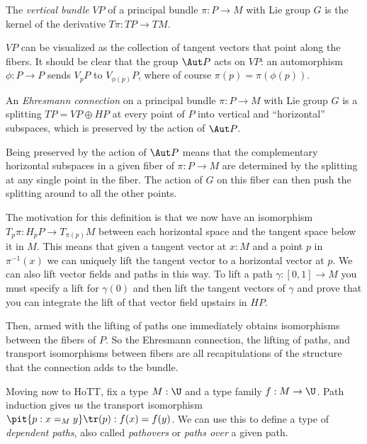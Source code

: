 \begin{mydef}
The \emph{vertical bundle} \( VP \) of a principal bundle \( \pi:P\to M \) with Lie group \( G \) is the kernel of the derivative \( T\pi:TP\to TM \). 
\end{mydef}

\(VP\) can be visualized as the collection of tangent vectors that point
along the fibers. It should be clear that the group \(\Aut P\) acts on
\(VP\): an automorphism \(\phi:P\to P\) sends \(V_pP\) to
\(V_{\phi(p)}P\), where of course \(\pi(p)=\pi(\phi(p))\).

\begin{mydef}
An \emph{Ehresmann connection} on a principal bundle \( \pi:P\to M \) with Lie group \( G \) is a splitting \( TP=VP\oplus HP \) at every point of \( P \) into vertical and ``horizontal'' subspaces, which is preserved by the action of \( \Aut P \).
\end{mydef}

Being preserved by the action of \(\Aut P\) means that the complementary
horizontal subspaces in a given fiber of \(\pi:P\to M\) are determined
by the splitting at any single point in the fiber. The action of \(G\)
on this fiber can then push the splitting around to all the other
points.

The motivation for this definition is that we now have an isomorphism
\(T_p\pi:H_pP\to T_{\pi(p)}M\) between each horizontal space and the
tangent space below it in \(M\). This means that given a tangent vector
at \(x:M\) and a point \(p\) in \(\pi^{-1}(x)\) we can uniquely lift the
tangent vector to a horizontal vector at \(p\). We can also lift vector
fields and paths in this way. To lift a path \(\gamma:[0,1]\to M\) you
must specify a lift for \(\gamma(0)\) and then lift the tangent vectors
of \(\gamma\) and prove that you can integrate the lift of that vector
field upstairs in \(HP\).

Then, armed with the lifting of paths one immediately obtains
isomorphisms between the fibers of \(P\). So the Ehresmann connection,
the lifting of paths, and transport isomorphisms between fibers are all
recapitulations of the structure that the connection adds to the bundle.

Moving now to HoTT, fix a type \(M:\U\) and a type family \(f:M\to\U\).
Path induction gives us the transport isomorphism
\(\pit{p:x=_M y}\tr(p):f(x)=f(y)\). We can use this to define a type of
\emph{dependent paths}, also called \emph{pathovers} or \emph{paths
over} a given path.

